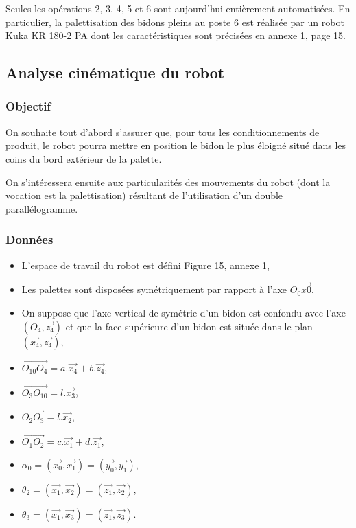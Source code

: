 Seules les opérations 2, 3, 4, 5 et 6 sont aujourd'hui entièrement automatisées. En particulier, la palettisation des bidons pleins au poste 6 est réalisée par un robot Kuka KR 180-2 PA dont les caractéristiques sont précisées en annexe 1, page 15.

\subsection{Analyse cinématique du robot}

\subsubsection{Objectif}

On souhaite tout d'abord s'assurer que, pour tous les conditionnements de produit, le robot pourra mettre en position le bidon le plus éloigné situé dans les coins du bord extérieur de la palette.

On s'intéressera ensuite aux particularités des mouvements du robot (dont la vocation est la palettisation) résultant de l'utilisation d'un double parallélogramme.


\subsubsection{Données}

\begin{itemize}
 \item L'espace de travail du robot est défini Figure 15, annexe 1,
 \item Les palettes sont disposées symétriquement par rapport à l'axe $\overrightarrow{O_0x0}$,
 \item On suppose que l'axe vertical de symétrie d'un bidon est confondu avec l'axe $(O_4,\overrightarrow{z_4})$ et que la face supérieure d'un bidon est située dans le plan $(\overrightarrow{x_4},\overrightarrow{z_4})$,
 \item $\overrightarrow{O_{10}O_4}=a.\overrightarrow{x_4}+b.\overrightarrow{z_4}$,
 \item $\overrightarrow{O_3O_{10}}=l.\overrightarrow{x_3}$,
 \item $\overrightarrow{O_2O_3}=l.\overrightarrow{x_2}$,
 \item $\overrightarrow{O_1O_2}=c.\overrightarrow{x_1}+d.\overrightarrow{z_1}$,
 \item $\alpha_0=(\overrightarrow{x_0},\overrightarrow{x_1})=(\overrightarrow{y_0},\overrightarrow{y_1})$,
 \item $\theta_2=(\overrightarrow{x_1},\overrightarrow{x_2})=(\overrightarrow{z_1},\overrightarrow{z_2})$,
 \item $\theta_3=(\overrightarrow{x_1},\overrightarrow{x_3})=(\overrightarrow{z_1},\overrightarrow{z_3})$.
\end{itemize}

